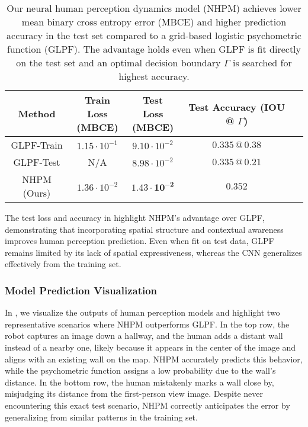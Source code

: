 \begin{table}[ht]
\begin{center}
\begin{small}
\begin{tabular}{c@{\hskip 8pt}c@{\hskip 8pt}c@{\hskip 8pt}c@{\hskip 8pt}r}
\toprule
Method & \makecell{Train Loss \\(MBCE)} & \makecell{Test Loss \\(MBCE)} & \makecell{Test Accuracy \\ (IOU @ $\Gamma$)} \\
\midrule
GLPF-Train & $1.15 \cdot 10^{-1}$ & $9.10 \cdot 10^{-2}$  & $0.335 \, @ \, 0.38$ \\
GLPF-Test & N/A & $8.98 \cdot 10^{-2}$ & $0.335 \, @ \, 0.21$ \\
NHPM (Ours)  & $1.36 \cdot 10^{-2}$ & $\mathbf{1.43 \cdot 10^{-2}}$ & $\mathbf{0.352}$  \\
\bottomrule
\end{tabular}
\end{small}
\end{center}
\vskip -0.1in
\caption{Our neural human perception dynamics model (NHPM) achieves lower mean binary cross entropy error (MBCE) and higher prediction accuracy in the test set compared to a grid-based logistic psychometric function (GLPF). The advantage holds even when GLPF is fit directly on the test set and an optimal decision boundary $\Gamma$ is searched for highest accuracy.}
\label{tab:perception_dynamics_evaluation}
\end{table}

The test loss and accuracy in  highlight NHPM's advantage over GLPF, demonstrating that incorporating spatial structure and contextual awareness improves human perception prediction. Even when fit on test data, GLPF remains limited by its lack of spatial expressiveness, whereas the CNN generalizes effectively from the training set.

\subsubsection{Model Prediction Visualization}

In , we visualize the outputs of human perception models and highlight two representative scenarios where NHPM outperforms GLPF. In the top row, the robot captures an image down a hallway, and the human adds a distant wall instead of a nearby one, likely because it appears in the center of the image and aligns with an existing wall on the map. NHPM accurately predicts this behavior, while the psychometric function assigns a low probability due to the wall's distance. In the bottom row, the human mistakenly marks a wall close by, misjudging its distance from the first-person view image. Despite never encountering this exact test scenario, NHPM correctly anticipates the error by generalizing from similar patterns in the training set.

